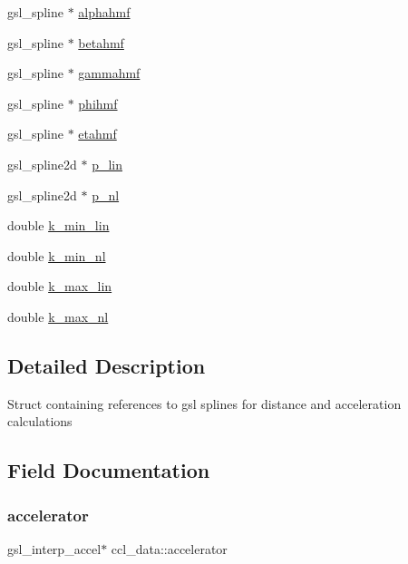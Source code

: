 \begin{DoxyCompactItemize}
\item 
gsl\+\_\+spline $\ast$ \mbox{\hyperlink{structccl__data_ad7fad40bf36fed46f5879104247de00b}{alphahmf}}
\item 
gsl\+\_\+spline $\ast$ \mbox{\hyperlink{structccl__data_a7ce4d3fb195d2dd11674bcc7e5f96afe}{betahmf}}
\item 
gsl\+\_\+spline $\ast$ \mbox{\hyperlink{structccl__data_a2d1c80d82e2d5373ca8c142d09853842}{gammahmf}}
\item 
gsl\+\_\+spline $\ast$ \mbox{\hyperlink{structccl__data_a6417dfa54222033c8c229d3ca5e0866e}{phihmf}}
\item 
gsl\+\_\+spline $\ast$ \mbox{\hyperlink{structccl__data_a1dea641d6ae09c5e2ee8811a21c6ceda}{etahmf}}
\item 
gsl\+\_\+spline2d $\ast$ \mbox{\hyperlink{structccl__data_aa965346f6aa1fe399a7a0d759fb85312}{p\+\_\+lin}}
\item 
gsl\+\_\+spline2d $\ast$ \mbox{\hyperlink{structccl__data_ad55e7ec9ee6a6d8ad95b3c9eb1eef92b}{p\+\_\+nl}}
\item 
double \mbox{\hyperlink{structccl__data_ac33675ca1fd015c79fcf3e18623ed405}{k\+\_\+min\+\_\+lin}}
\item 
double \mbox{\hyperlink{structccl__data_a2ab9d362ddf213f30d73c4cac4c60141}{k\+\_\+min\+\_\+nl}}
\item 
double \mbox{\hyperlink{structccl__data_a36afcf1cc6daf98b42b8e9c55338dad7}{k\+\_\+max\+\_\+lin}}
\item 
double \mbox{\hyperlink{structccl__data_a26b24c2ae6bb9b41b2f3a64a14fc65af}{k\+\_\+max\+\_\+nl}}
\end{DoxyCompactItemize}


\subsection{Detailed Description}
Struct containing references to gsl splines for distance and acceleration calculations 

\subsection{Field Documentation}
\mbox{\label{structccl__data_ad8d2aef21dc9cf1fdee8e4afe3778b33}} 
\subsubsection{\texorpdfstring{accelerator}{accelerator}}
{\footnotesize\ttfamily gsl\+\_\+interp\+\_\+accel$\ast$ ccl\+\_\+data\+::accelerator}

